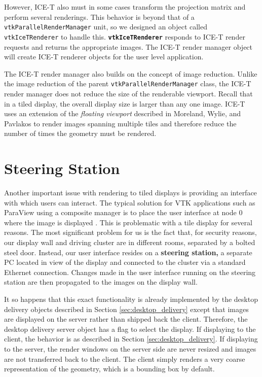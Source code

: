 \documentclass{acmsiggraph}
\newcommand{\cidentifier}[1]{\texttt{#1}}
\newcommand{\keyterm}[1]{\textbf{#1}}
\begin{document}
  However, ICE-T also must in some cases transform the projection matrix
  and perform several renderings.  This behavior is beyond that of a
  \cidentifier{vtk\-Parallel\-Render\-Manager} unit, so we designed an
  object called \cidentifier{vtk\-Ice\-T\-Renderer} to handle this.
  \keyterm{\cidentifier{vtk\-Ice\-T\-Renderer}} responds to ICE-T render
  requests and returns the appropriate images.  The ICE-T render manager
  object will create ICE-T renderer objects for the user level application.

  The ICE-T render manager also builds on the concept of image reduction.
  Unlike the image reduction of the parent
  \cidentifier{vtk\-Parallel\-Render\-Manager} class, the ICE-T render
  manager does not reduce the size of the renderable viewport.  Recall that
  in a tiled display, the overall display size is larger than any one
  image.  ICE-T uses an extension of the \emph{floating viewport} described
  in Moreland, Wylie, and Pavlakos \cite{Moreland01} to render images
  spanning multiple tiles and therefore reduce the number of times the
  geometry must be rendered.


  \section{Steering Station}
  \label{sec:steering_station}

  Another important issue with rendering to tiled displays is providing an
  interface with which users can interact.  The typical solution for VTK
  applications such as ParaView using a composite manager is to place the
  user interface at node 0 where the image is displayed \cite{Law01}.  This
  is problematic with a tile display for several reasons.  The most
  significant problem for us is the fact that, for security reasons, our
  display wall and driving cluster are in different rooms, separated by a
  bolted steel door.  Instead, our user interface resides on a
  \keyterm{steering station,} a separate PC located in view of the display
  and connected to the cluster via a standard Ethernet connection.  Changes
  made in the user interface running on the steering station are then
  propagated to the images on the display wall.

  It so happens that this exact functionality is already implemented by the
  desktop delivery objects described in Section \ref{sec:desktop_delivery}
  except that images are displayed on the server rather than shipped back
  the client.  Therefore, the desktop delivery server object has a flag to
  select the display.  If displaying to the client, the behavior is as
  described in Section \ref{sec:desktop_delivery}.  If displaying to the
  server, the render windows on the server side are never resized and
  images are not transferred back to the client.  The client simply renders
  a very coarse representation of the geometry, which is a bounding box by
  default.
\end{document}
